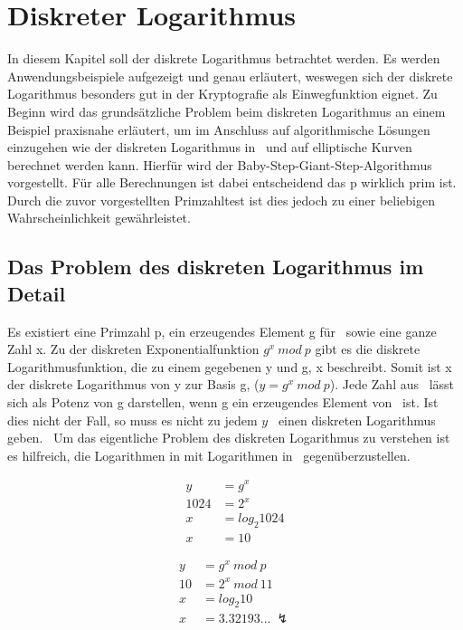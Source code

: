 \section{Diskreter Logarithmus}\label{Kapitel Diskreter Logarithmus}
	In diesem Kapitel soll der diskrete Logarithmus betrachtet werden. Es werden Anwendungsbeispiele aufgezeigt und genau erläutert, weswegen sich der diskrete Logarithmus besonders gut in der Kryptografie als Einwegfunktion eignet. Zu Beginn wird das grundsätzliche Problem beim diskreten Logarithmus an einem Beispiel praxisnahe erläutert, um im Anschluss auf algorithmische Lösungen einzugehen wie der diskreten Logarithmus in \myZPStern~und auf elliptische Kurven berechnet werden kann. Hierfür wird der Baby-Step-Giant-Step-Algorithmus vorgestellt. Für alle Berechnungen ist dabei entscheidend das p wirklich prim ist. Durch die zuvor vorgestellten Primzahltest ist dies jedoch zu einer beliebigen Wahrscheinlichkeit gewährleistet.  

	\subsection{Das Problem des diskreten Logarithmus im Detail}\label{Das Problem des diskreten Logarithmus im Detail}
		Es existiert eine Primzahl p, ein erzeugendes Element g für \myZPStern~sowie eine ganze Zahl x. Zu der diskreten Exponentialfunktion $g^x~mod~p$ gibt es die diskrete Logarithmusfunktion, die zu einem gegebenen y und g, x beschreibt. Somit ist x der diskrete Logarithmus von y zur Basis g, ($y = g^x~mod~p$). Jede Zahl aus \myZPStern~lässt sich als Potenz von g darstellen, wenn g ein erzeugendes Element von \myZPStern~ist. Ist dies nicht der Fall, so muss es nicht zu jedem $y$ \myin \myZPStern~einen diskreten Logarithmus geben.~\cite{Kryptografie:in:Theorie:und:Praxis} Um das eigentliche Problem des diskreten Logarithmus zu verstehen ist es hilfreich, die Logarithmen in  mit Logarithmen in \myZPStern~gegenüberzustellen.
		\begin{minipage}{0.24\textwidth}
			\begin{equation}
			\begin{aligned}
			y &= g^x\\
			1024 &= 2^x\\
			x &= log_2 1024\\
			x &= 10
			\end{aligned}
			\label{Gleichung Log in Z}
			\end{equation}
		\end{minipage}
		\begin{minipage}{0.24\textwidth}
			\begin{equation}
			\begin{aligned}
			y &= g^x~mod~p\\
			10 &= 2^x~mod~11\\
			x &= log_2 10\\
			x &= 3.32193...~\lightning
			\end{aligned}
			\label{Gleichung Log in ZP}
			\end{equation}
		\end{minipage}

